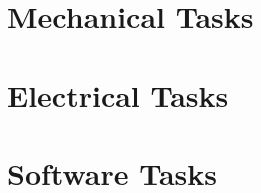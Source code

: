 
\section{Mechanical Tasks}
\label{sec:tasks_mechanical}



\section{Electrical Tasks}
\label{sec:tasks_electrical}



\section{Software Tasks}
\label{sec:tasks_software}


